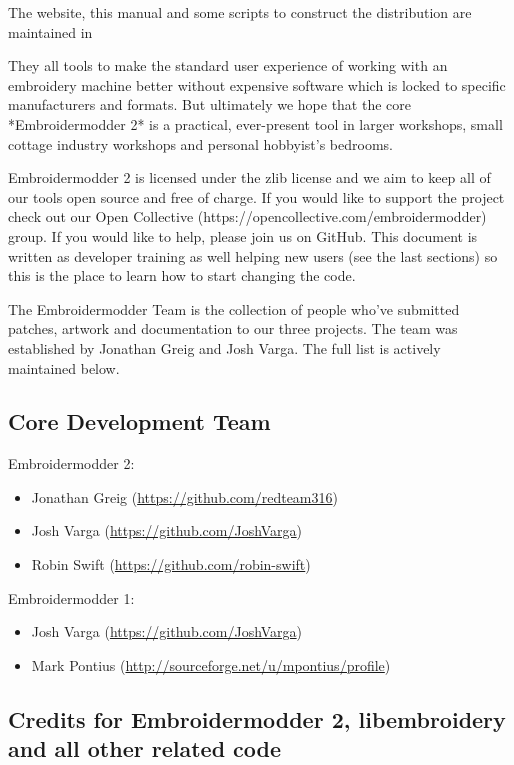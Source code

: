 \documentclass[a4paper]{report}
\begin{document}
The website, this manual and some scripts to construct the distribution are
maintained in %

They all tools to make the standard
user experience of working with an embroidery machine better without expensive
software which is locked to specific manufacturers and formats. But ultimately
we hope that the core *Embroidermodder 2* is a practical, ever-present tool in
larger workshops, small cottage industry workshops and personal hobbyist's
bedrooms.

Embroidermodder 2 is licensed under the zlib license and we aim to keep all of our tools open
source and free of charge. If you would like to support the project check out our  Open
Collective (https://opencollective.com/embroidermodder) group.
If you would like to help,
please join us on GitHub. This document is written as developer training as well helping new
users (see the last sections) so this is the place to learn how to start changing the code.

The Embroidermodder Team is the collection of people who've submitted
patches, artwork and documentation to our three projects.
The team was established by Jonathan Greig and Josh Varga.
The full list is actively maintained below.

\subsection{Core Development Team}

Embroidermodder 2:

\begin{itemize}
\item Jonathan Greig (\url{https://github.com/redteam316})
\item Josh Varga (\url{https://github.com/JoshVarga})
\item Robin Swift (\url{https://github.com/robin-swift})
\end{itemize}

Embroidermodder 1:

\begin{itemize}
\item Josh Varga (\url{https://github.com/JoshVarga})
\item Mark Pontius (\url{http://sourceforge.net/u/mpontius/profile})
\end{itemize}

\subsection{Credits for Embroidermodder 2, libembroidery and all other related code}
\end{document}
